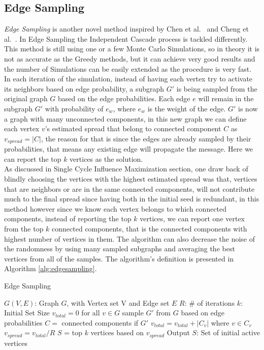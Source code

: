 \documentclass[english]{tktltiki}
\begin{document}
\subsection{Edge Sampling}
\textit{Edge Sampling} is another novel method inspired by Chen et al.\ \cite{chen09} and Cheng et al.\ \cite{cheng13}.
In Edge Sampling the Independent Cascade process is tackled differently. 
This method is still using one or a few Monte Carlo Simulations, so in theory it is not as accurate as the Greedy methods, but it can achieve very good results and the number of Simulations can be easily extended as the procedure is very fast. In each iteration of the simulation, instead of having each vertex try to activate its neighbors based on edge probability, a subgraph $G'$ is being sampled from the original graph $G$ based on the edge probabilities. Each edge $e$ will remain in the subgraph $G'$ with probability of $e_w$, where $e_w$ is the weight of the edge. $G'$ is now a graph with many unconnected components, in this new graph we can define each vertex $v$'s estimated spread that belong to connected component $C$ as $v_{spread} = |C|$, the reason for that is since the edges are already sampled by their probabilities, that means any existing edge will propagate the message. Here we can report the top $k$ vertices as the solution. \\
As discussed in Single Cycle Influence Maximization section, one draw back of blindly choosing the vertices with the highest estimated spread was that, vertices that are neighbors or are in the same connected components, will not contribute much to the final spread since having both in the initial seed is redundant, in this method however since we know each vertex belongs to which connected components, instead of reporting the top $k$ vertices, we can report one vertex from the top $k$ connected components, that is the connected components with highest number of vertices in them. The algorithm can also decrease the noise of the randomness by using many sampled subgraphs and averaging the best vertices from all of the samples. The algorithm's definition is presented in Algorithm \ref{alg:edgesampling}.
\begin{algorithm}[ht!]
\caption{Edge Sampling}
\label{alg:edgesampling}
\begin{algorithmic}
\Require $G(V,E)$: Graph $G$, with Vertex set V and Edge set $E$
\Require $R$: \# of iterations
\Require $k$: Initial Set Size
\State $v_{total}=0$ for all $v \in G$
	\State sample $G'$ from $G$ based on edge probabilities
	\State $C =$ connected components if $G'$
       	\State $v_{total} = v_{total} + |C_v|$ where $v \in C_v$
	\EndFor
\EndFor
{}
	\State $v_{spread}=v_{total}/R$
\EndFor
\State $S$ = top $k$ vertices based on $v_{spread}$
\State Output $S$: Set of initial active vertices
\end{algorithmic}
\end{algorithm}
\end{document}
